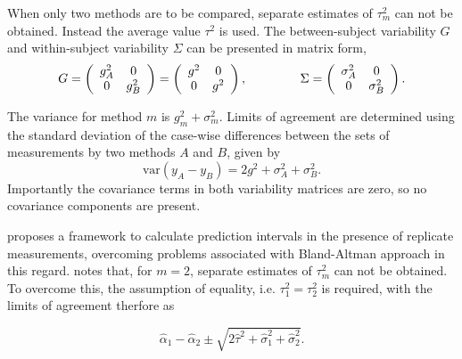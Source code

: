 \documentclass[12pt, a4paper]{report}
\theoremstyle{plain}
\theoremstyle{definition}
\theoremstyle{remark}
\begin{document}
	When only two methods are to be compared, separate estimates of $\tau^2_m$ can not be obtained. Instead the average value $\tau^2$ is used. The between-subject variability ${G}$ and within-subject variability ${\Sigma}$ can be presented in matrix form,\[
	{G} = \left(%
	\begin{array}{cc}
	g^2_{A}& 0 \\
	0 & g^2_{B} \\
	\end{array}%
	\right)=\left(%
	\begin{array}{cc}
	g^2& 0 \\
	0 & g^2\\
	\end{array}%
	\right),
	\hspace{1.5cm}
	{\Sigma} = \left(%
	\begin{array}{cc}
	\sigma^2_{A}& 0 \\
	0 & \sigma^2_{B} \\
	\end{array}%
	\right).
	\]
	
	The variance for method $m$ is $g^2_{m}+\sigma^2_{m}$. Limits of agreement are determined using the standard deviation of the case-wise differences between the sets of measurements by two methods $A$ and $B$, given by
	\begin{equation}
	\mbox{var} (y_{A}-y_{B}) = 2g^2 + \sigma^2_{A}+ \sigma^2_{B}.
	\end{equation}
	Importantly the covariance terms in both variability matrices are zero, so no covariance components are present. 
	
\citet{BXC2008} proposes a framework to calculate prediction intervals in the presence of replicate measurements, overcoming problems associated with Bland-Altman approach in this regard. \citet{BXC2008} notes that, for $m=2$, separate estimates of $\tau^2_m$ can not be obtained. To overcome this, the assumption of equality, i.e. $\tau^2_1 = \tau^2_2$ is required, with the limits of agreement therfore
	as
	
	\[
	\hat{\alpha}_1 - \hat{\alpha}_2 \pm \sqrt{2 \hat{\tau}^2 +
		\hat{\sigma}^2_1 + \hat{\sigma}^2_2}.
	\]
	
	
	
	
	
	
	
\end{document}
